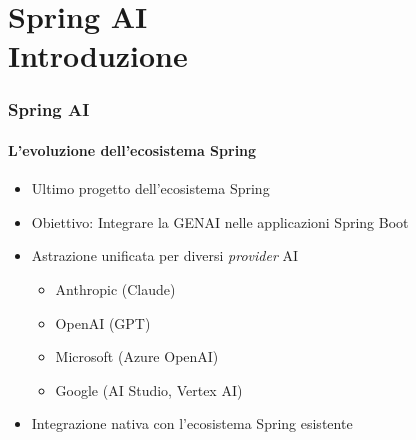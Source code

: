 \section{Spring AI\\{\small Introduzione}} %
\label{sec:spring_ai_intro}
%
\begin{frame}[t,fragile] \frametitle{Spring AI}
    \framesubtitle{L'evoluzione dell'ecosistema Spring}	
	{\small
	    \begin{minipage}[t]{\textwidth}
	    	\begin{itemize}[leftmargin=10pt,align=right]
				\onslide<1->\item[\alert{\faArrowCircleRight}] Ultimo progetto dell'ecosistema Spring
				\onslide<2->\item[\alert{\faArrowCircleRight}] \alert{Obiettivo:} Integrare la GENAI nelle applicazioni Spring Boot
				\onslide<3->\item[\alert{\faArrowCircleRight}] \alert{Astrazione unificata} per diversi \textit{provider} AI
				\begin{itemize}[leftmargin=10pt,align=right]
					\item[\alert{\faArrowCircleRight}] Anthropic (Claude)
					\item[\alert{\faArrowCircleRight}] OpenAI (GPT)
					\item[\alert{\faArrowCircleRight}] Microsoft (Azure OpenAI)
					\item[\alert{\faArrowCircleRight}] Google (AI Studio, Vertex AI)
				\end{itemize}				
				\item[\alert{\faArrowCircleRight}] Integrazione \alert{nativa} con l'ecosistema Spring esistente
			\end{itemize}
        \end{minipage}
	}
\end{frame}
%
